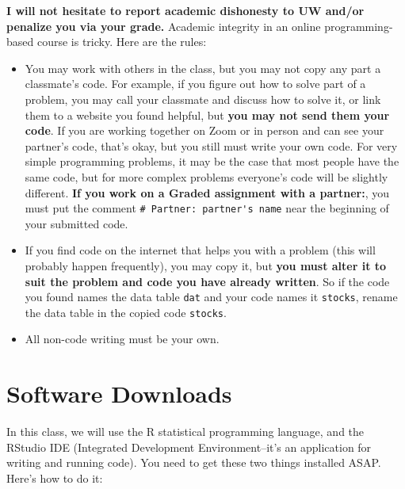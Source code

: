 \documentclass[12pt]{article}
\begin{document}
\textbf{I will not hesitate to report academic dishonesty to UW and/or penalize you via your grade.} Academic integrity in an online programming-based course is tricky. Here are the rules:
\begin{itemize}
	\item You may work with others in the class, but you may not copy any part a classmate's code. For example, if you figure out how to solve part of a problem, you may call your classmate and discuss how to solve it, or link them to a website you found helpful, but \textbf{you may not send them your code}. If you are working together on Zoom or in person and can see your partner's code, that's okay, but you still must write your own code. For very simple programming problems, it may be the case that most people have the same code, but for more complex problems everyone's code will be slightly different. \textbf{If you work on a Graded assignment with a partner:}, you must put the comment \verb|# Partner: partner's name| near the beginning of your submitted code.
	\item If you find code on the internet that helps you with a problem (this will probably happen frequently), you may copy it, but \textbf{you must alter it to suit the problem and code you have already written}. So if the code you found names the data table \verb|dat| and your code names it \verb|stocks|, rename the data table in the copied code \verb|stocks|.
	\item All non-code writing must be your own.
\end{itemize}

\section*{Software Downloads}

In this class, we will use the R statistical programming language, and the RStudio IDE (Integrated Development Environment--it's an application for writing and running code). You need to get these two things installed ASAP. Here's how to do it:
\end{document}
